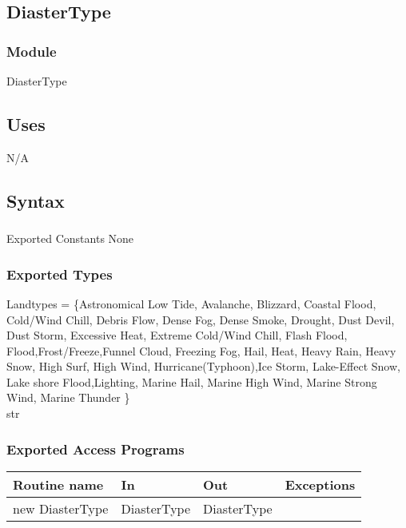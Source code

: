 \documentclass[12pt]{article}
\begin{document}
                \subsection* {DiasterType}
                
                \subsubsection*{Module}
                DiasterType
                
                \subsection* {Uses}
                N/A
                
                \subsection* {Syntax}
                
                \subsubsection*{} {Exported Constants}
                None
                \subsubsection* {Exported Types}
                Landtypes = \{Astronomical Low Tide, Avalanche, Blizzard, Coastal Flood, Cold/Wind Chill, Debris Flow, Dense Fog, Dense Smoke, Drought, Dust Devil, Dust Storm, Excessive Heat, Extreme Cold/Wind Chill, Flash Flood, Flood,Frost/Freeze,Funnel Cloud, Freezing Fog, Hail, Heat, Heavy Rain, Heavy Snow, High Surf, High Wind, Hurricane(Typhoon),Ice Storm, Lake-Effect Snow, Lake shore Flood,Lighting, Marine Hail, Marine High Wind, Marine Strong Wind, Marine Thunder  \}\\

       str         \subsubsection* {Exported Access Programs}
                
                
                \begin{tabular}{| l | l | l | p{5cm} |}
                \hline
                \textbf{Routine name} & \textbf{In} & \textbf{Out} & \textbf{Exceptions}\\
                \hline
                new DiasterType & DiasterType & DiasterType & ~\\
                \hline
                \end{tabular}
                
\end{document}
